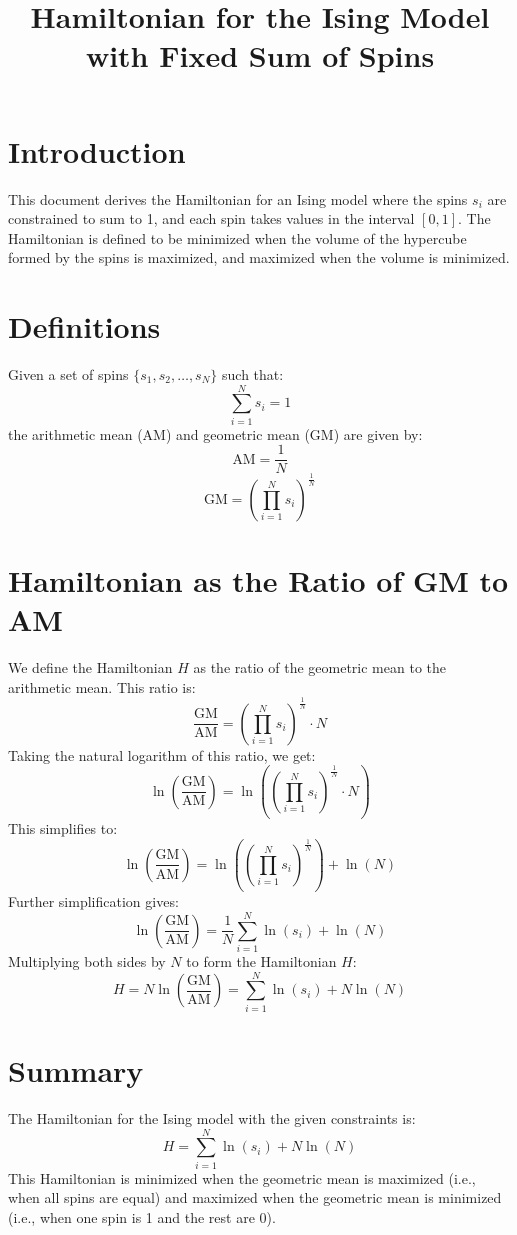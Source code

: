 \documentclass{article}
\begin{document}
\title{Hamiltonian for the Ising Model with Fixed Sum of Spins}
\author{}
\date{}
\maketitle

\section*{Introduction}
This document derives the Hamiltonian for an Ising model where the spins \( s_i \) are constrained to sum to 1, and each spin takes values in the interval \([0,1]\). The Hamiltonian is defined to be minimized when the volume of the hypercube formed by the spins is maximized, and maximized when the volume is minimized.

\section*{Definitions}
Given a set of spins \( \{s_1, s_2, \ldots, s_N\} \) such that:
\[
\sum_{i=1}^N s_i = 1
\]
the arithmetic mean (AM) and geometric mean (GM) are given by:
\[
\text{AM} = \frac{1}{N}
\]
\[
\text{GM} = \left( \prod_{i=1}^N s_i \right)^{\frac{1}{N}}
\]

\section*{Hamiltonian as the Ratio of GM to AM}
We define the Hamiltonian \( H \) as the ratio of the geometric mean to the arithmetic mean. This ratio is:
\[
\frac{\text{GM}}{\text{AM}} = \left( \prod_{i=1}^N s_i \right)^{\frac{1}{N}} \cdot N
\]
Taking the natural logarithm of this ratio, we get:
\[
\ln\left( \frac{\text{GM}}{\text{AM}} \right) = \ln\left( \left( \prod_{i=1}^N s_i \right)^{\frac{1}{N}} \cdot N \right)
\]
This simplifies to:
\[
\ln\left( \frac{\text{GM}}{\text{AM}} \right) = \ln\left( \left( \prod_{i=1}^N s_i \right)^{\frac{1}{N}} \right) + \ln(N)
\]
Further simplification gives:
\[
\ln\left( \frac{\text{GM}}{\text{AM}} \right) = \frac{1}{N} \sum_{i=1}^N \ln(s_i) + \ln(N)
\]
Multiplying both sides by \( N \) to form the Hamiltonian \( H \):
\[
H = N \ln\left( \frac{\text{GM}}{\text{AM}} \right) = \sum_{i=1}^N \ln(s_i) + N \ln(N)
\]

\section*{Summary}
The Hamiltonian for the Ising model with the given constraints is:
\[
H = \sum_{i=1}^N \ln(s_i) + N \ln(N)
\]
This Hamiltonian is minimized when the geometric mean is maximized (i.e., when all spins are equal) and maximized when the geometric mean is minimized (i.e., when one spin is 1 and the rest are 0).
\end{document}
